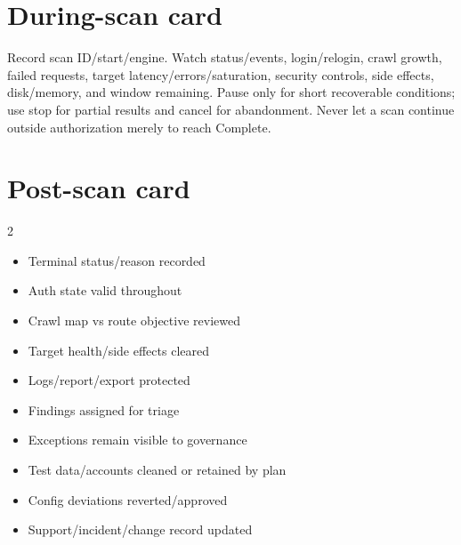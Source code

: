 \documentclass[11pt,letterpaper,oneside]{scrreprt}
\begin{document}
\section{During-scan card}
Record scan ID/start/engine. Watch status/events, login/relogin, crawl growth, failed requests, target latency/errors/saturation, security controls, side effects, disk/memory, and window remaining. Pause only for short recoverable conditions; use stop for partial results and cancel for abandonment. Never let a scan continue outside authorization merely to reach Complete.

\section{Post-scan card}
\begin{multicols}{2}
\begin{itemize}
  \item[$\square$] Terminal status/reason recorded
  \item[$\square$] Auth state valid throughout
  \item[$\square$] Crawl map vs route objective reviewed
  \item[$\square$] Target health/side effects cleared
  \item[$\square$] Logs/report/export protected
  \item[$\square$] Findings assigned for triage
  \item[$\square$] Exceptions remain visible to governance
  \item[$\square$] Test data/accounts cleaned or retained by plan
  \item[$\square$] Config deviations reverted/approved
  \item[$\square$] Support/incident/change record updated
\end{itemize}
\end{multicols}
\end{document}
